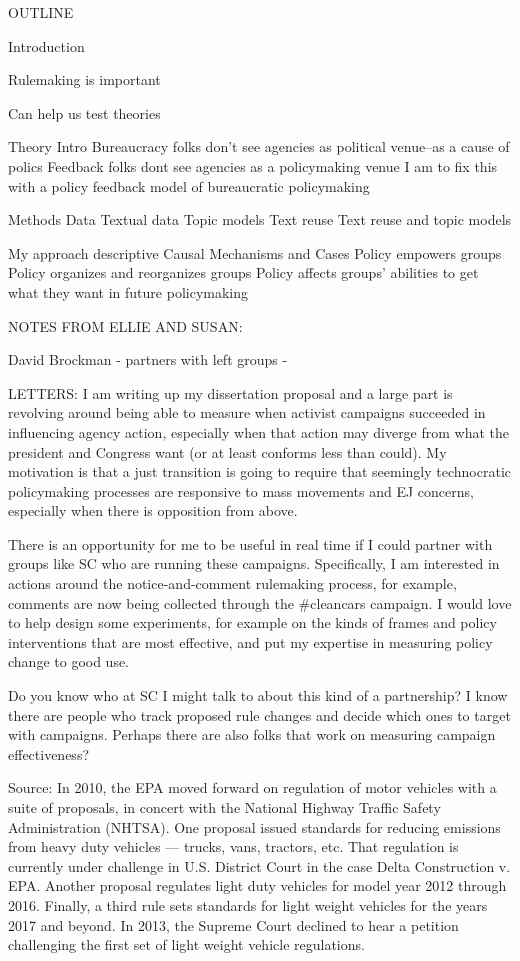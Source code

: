 OUTLINE 

Introduction 

Rulemaking is important 

Can help us test theories

Theory 
Intro
Bureaucracy folks don’t see agencies as political venue--as a cause of polics
Feedback folks dont see agencies as a policymaking venue 
I am to fix this with a policy feedback model of bureaucratic policymaking

Methods 
Data
Textual data 
Topic models 
Text reuse 
Text reuse and topic models 

My approach
descriptive 
Causal 
Mechanisms and Cases 
Policy empowers groups
Policy organizes and reorganizes groups 
Policy affects groups’ abilities to get what they want in future policymaking


NOTES FROM ELLIE AND SUSAN: 


David Brockman 
- partners with left groups
- 



LETTERS:
I am writing up my dissertation proposal and a large part is revolving around being able to measure when activist campaigns succeeded in influencing agency action, especially when that action may diverge from what the president and Congress want (or at least conforms less than could). My motivation is that a just transition is going to require that seemingly technocratic policymaking processes are responsive to mass movements and EJ concerns, especially when there is opposition from above. 

There is an opportunity for me to be useful in real time if I could partner with groups like SC who are running these campaigns. Specifically, I am interested in actions around the notice-and-comment rulemaking process, for example, comments are now being collected through the #cleancars campaign. I would love to help design some experiments, for example on the kinds of frames and policy interventions that are most effective, and put my expertise in measuring policy change to good use.

Do you know who at SC I might talk to about this kind of a partnership? I know there are people who track proposed rule changes and decide which ones to target with campaigns. Perhaps there are also folks that work on measuring campaign effectiveness? 






Source:
In 2010, the EPA moved forward on regulation of motor vehicles with a suite of proposals, in concert with the National Highway Traffic Safety Administration (NHTSA). One proposal issued standards for reducing emissions from heavy duty vehicles — trucks, vans, tractors, etc. That regulation is currently under challenge in U.S. District Court in the case Delta Construction v. EPA. Another proposal regulates light duty vehicles for model year 2012 through 2016. Finally, a third rule sets standards for light weight vehicles for the years 2017 and beyond. In 2013, the Supreme Court declined to hear a petition challenging the first set of light weight vehicle regulations.

